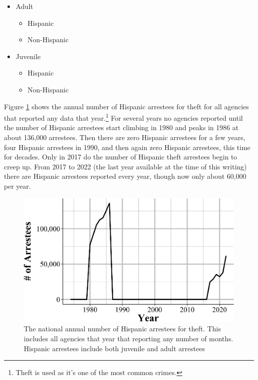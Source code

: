 \documentclass[
  12pt,
  openany]{book}
\providecommand{\tightlist}{%
  \setlength{\itemsep}{0pt}\setlength{\parskip}{0pt}}
\begin{document}
\begin{itemize}
\tightlist
\item
  Adult

  \begin{itemize}
  \tightlist
  \item
    Hispanic
  \item
    Non-Hispanic
  \end{itemize}
\item
  Juvenile

  \begin{itemize}
  \tightlist
  \item
    Hispanic
  \item
    Non-Hispanic
  \end{itemize}
\end{itemize}

Figure \ref{fig:theftHispanic} shows the annual number of Hispanic arrestees for theft for all agencies that reported any data that year.\footnote{Theft is used as it's one of the most common crimes.} For several years no agencies reported until the number of Hispanic arrestees start climbing in 1980 and peaks in 1986 at about 136,000 arrestees. Then there are zero Hispanic arrestees for a few years, four Hispanic arrestees in 1990, and then again zero Hispanic arrestees, this time for decades. Only in 2017 do the number of Hispanic theft arrestees begin to creep up. From 2017 to 2022 (the last year available at the time of this writing) there are Hispanic arrestees reported every year, though now only about 60,000 per year.

\begin{figure}

{\centering \includegraphics[width=0.9\linewidth]{05_arrests_files/figure-latex/theftHispanic-1} 

}

\caption{The national annual number of Hispanic arrestees for theft. This includes all agencies that year that reporting any number of months. Hispanic arrestees include both juvenile and adult arrestees}\label{fig:theftHispanic}
\end{figure}
\end{document}
